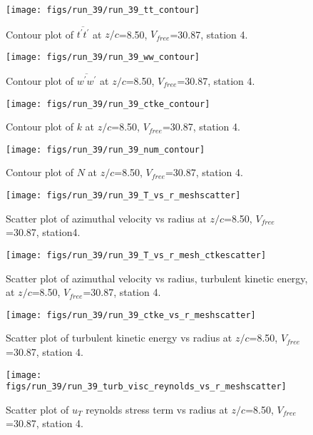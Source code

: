 \begin{figure}[H]
\centering
\texttt{[image: figs/run\_39/run\_39\_tt\_contour]}
\caption{Contour plot of $\overline{t^\prime t^\prime}$ at $z/c$=8.50, $V_{free}$=30.87, station 4.}
\end{figure}


\begin{figure}[H]
\centering
\texttt{[image: figs/run\_39/run\_39\_ww\_contour]}
\caption{Contour plot of $\overline{w^\prime w^\prime}$ at $z/c$=8.50, $V_{free}$=30.87, station 4.}
\end{figure}


\begin{figure}[H]
\centering
\texttt{[image: figs/run\_39/run\_39\_ctke\_contour]}
\caption{Contour plot of $k$ at $z/c$=8.50, $V_{free}$=30.87, station 4.}
\end{figure}


\begin{figure}[H]
\centering
\texttt{[image: figs/run\_39/run\_39\_num\_contour]}
\caption{Contour plot of $N$ at $z/c$=8.50, $V_{free}$=30.87, station 4.}
\end{figure}


\begin{figure}[H]
\centering
\texttt{[image: figs/run\_39/run\_39\_T\_vs\_r\_meshscatter]}
\caption{Scatter plot of azimuthal velocity vs radius at $z/c$=8.50, $V_{free}$=30.87, station4.}
\end{figure}


\begin{figure}[H]
\centering
\texttt{[image: figs/run\_39/run\_39\_T\_vs\_r\_mesh\_ctkescatter]}
\caption{Scatter plot of azimuthal velocity vs radius, turbulent kinetic energy, at $z/c$=8.50, $V_{free}$=30.87, station 4.}
\end{figure}


\begin{figure}[H]
\centering
\texttt{[image: figs/run\_39/run\_39\_ctke\_vs\_r\_meshscatter]}
\caption{Scatter plot of turbulent kinetic energy vs radius at $z/c$=8.50, $V_{free}$=30.87, station 4.}
\end{figure}


\begin{figure}[H]
\centering
\texttt{[image: figs/run\_39/run\_39\_turb\_visc\_reynolds\_vs\_r\_meshscatter]}
\caption{Scatter plot of $
u_T$ reynolds stress term vs radius at $z/c$=8.50, $V_{free}$=30.87, station 4.}
\end{figure}


